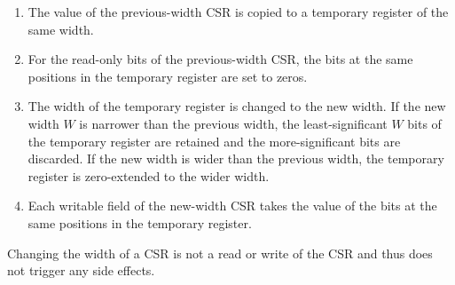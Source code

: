 \begin{enumerate}

\item The value of the previous-width CSR is copied to a temporary register of
the same width.

\item For the read-only bits of the previous-width CSR, the bits at the same
positions in the temporary register are set to zeros.

\item The width of the temporary register is changed to the new width. If the
new width $W$ is narrower than the previous width, the least-significant $W$
bits of the temporary register are retained and the more-significant bits are
discarded. If the new width is wider than the previous width, the temporary
register is zero-extended to the wider width.

\item Each writable field of the new-width CSR takes the value of the bits at
the same positions in the temporary register.

\end{enumerate}

Changing the width of a CSR is not a read or write of the CSR and thus
does not trigger any side effects.
